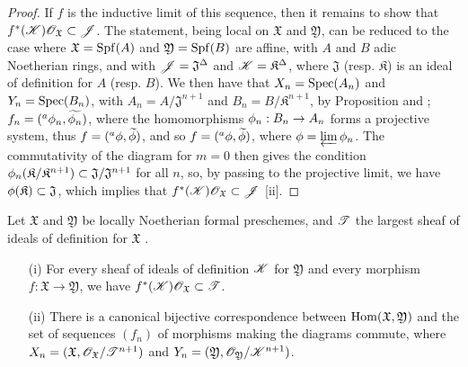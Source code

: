 \begin{proof}
\label{proof-1.10.6.9}
If $f$ is the inductive limit of this sequence, then it remains to show that $f^*(\mathscr{K})\mathscr{O}_\mathfrak{X}\subset\mathscr{J}$.
The statement, being local on $\mathfrak{X}$ and $\mathfrak{Y}$, can be reduced to the case where $\mathfrak{X}=\operatorname{Spf}(A)$ and $\mathfrak{Y}=\operatorname{Spf}(B)$ are affine, with $A$ and $B$ adic Noetherian rings, and with $\mathscr{J}=\mathfrak{J}^\Delta$ and $\mathscr{K}=\mathfrak{K}^\Delta$, where $\mathfrak{J}$ (resp. $\mathfrak{K}$) is an ideal of definition for $A$ (resp. $B$).
We then have that $X_n=\operatorname{Spec}(A_n)$ and $Y_n=\operatorname{Spec}(B_n)$, with $A_n=A/\mathfrak{J}^{n+1}$ and $B_n=B/\mathfrak{K}^{n+1}$, by Proposition  and ; $f_n=({}^a\phi_n,\widetilde{\phi_n})$, where the homomorphisms $\vphi_n:B_n\to A_n$ forms a projective system, thus $f=({}^a\phi,\widetilde{\phi})$, and so $f=({}^a\phi,\widetilde{\phi})$, where $\phi=\varprojlim\phi_n$.
The commutativity of the diagram  for $m=0$ then gives the condition $\phi_n(\mathfrak{K}/\mathfrak{K}^{n+1})\subset\mathfrak{J}/\mathfrak{J}^{n+1}$ for all $n$, so, by passing to the projective limit, we have $\phi(\mathfrak{K})\subset\mathfrak{J}$, which implies that $f^*(\mathscr{K})\mathscr{O}_\mathfrak{X}\subset\mathscr{J}$ [ii].
\end{proof}

\begin{corollary}[10.6.10]
\label{1.10.6.10}
Let $\mathfrak{X}$ and $\mathfrak{Y}$ be locally Noetherian formal preschemes, and $\mathscr{T}$ the largest sheaf of ideals of definition for $\mathfrak{X}$ .
\begin{enumerate}
  \item[\rm{(i)}] For every sheaf of ideals of definition $\mathscr{K}$ for $\mathfrak{Y}$ and every morphism $f:\mathfrak{X}\to\mathfrak{Y}$, we have $f^*(\mathscr{K})\mathscr{O}_\mathfrak{X}\subset\mathscr{T}$.
  \item[\rm{(ii)}] There is a canonical bijective correspondence between $\operatorname{Hom}(\mathfrak{X},\mathfrak{Y})$ and the set of sequences $(f_n)$ of morphisms making the diagrams  commute, where $X_n=(\mathfrak{X},\mathscr{O}_\mathfrak{X}/\mathscr{T}^{n+1})$ and $Y_n=(\mathfrak{Y},\mathscr{O}_\mathfrak{Y}/\mathscr{K}^{n+1})$.
\end{enumerate}
\end{corollary}

